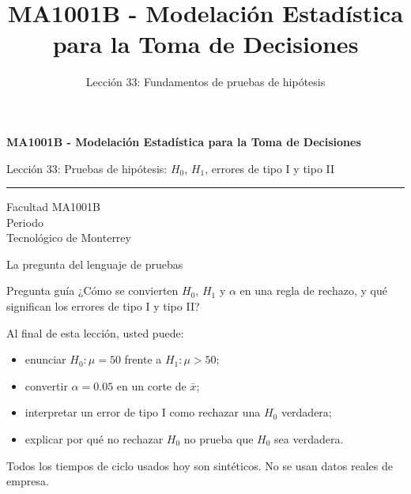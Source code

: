 \documentclass[aspectratio=169,10pt,spanish]{beamer}
\title{MA1001B - Modelación Estadística para la Toma de Decisiones}
\subtitle{Lección 33: Fundamentos de pruebas de hipótesis}
\author{}
\institute{Tecnol\'ogico de Monterrey}
\date{}
\begin{document}
\begin{frame}[plain]
  \vspace{1.2cm}
  {\Large\bfseries MA1001B - Modelación Estadística para la Toma de Decisiones\par}
  \vspace{0.7cm}
  {\large Lección 33: Pruebas de hipótesis: $H_{0}$, $H_{1}$, errores de tipo I y tipo II\par}
  \vspace{0.7cm}
  {\color{TecRojo}\rule{\textwidth}{1.2pt}}
  \vspace{0.8cm}

  Facultad MA1001B\\[0.3cm]
  Periodo\\[0.3cm]
  Tecnol\'ogico de Monterrey
\end{frame}

\begin{frame}{La pregunta del lenguaje de pruebas}
  \begin{alertblock}{Pregunta guía}
    ¿Cómo se convierten $H_{0}$, $H_{1}$ y $\alpha$ en una regla de rechazo, y
    qué significan los errores de tipo I y tipo II?
  \end{alertblock}

  \vspace{0.6em}
  Al final de esta lección, usted puede:
  \begin{itemize}
    \item enunciar $H_{0}:\mu=50$ frente a $H_{1}:\mu>50$;
    \item convertir $\alpha=0.05$ en un corte de $\bar{x}$;
    \item interpretar un error de tipo I como rechazar una $H_{0}$ verdadera;
    \item explicar por qué no rechazar $H_{0}$ no prueba que $H_{0}$ sea verdadera.
  \end{itemize}

  \vfill
  \scriptsize Todos los tiempos de ciclo usados hoy son sintéticos. No se usan datos reales de empresa.
\end{frame}
\end{document}
